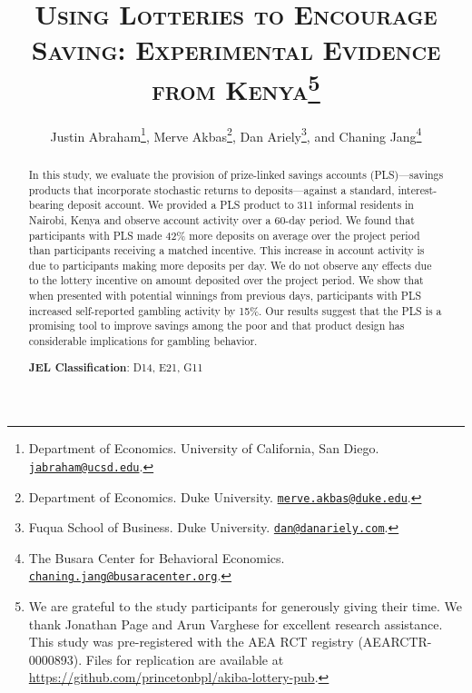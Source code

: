 \documentclass[11pt]{article}
\begin{document}
\title{\textsc{Using Lotteries to Encourage Saving: Experimental Evidence from Kenya}\protect\footnote{We are grateful to the study participants for generously giving their time. We thank Jonathan Page and Arun Varghese for excellent research assistance. This study was pre-registered with the AEA RCT registry (AEARCTR-0000893). Files for replication are available at \url{https://github.com/princetonbpl/akiba-lottery-pub}.}}

\author{Justin Abraham\thanks{Department of Economics. University of California, San Diego. \protect\href{mailto:jabraham@ucsd.edu}{\nolinkurl{jabraham@ucsd.edu}}.}, Merve Akbas\thanks{Department of Economics. Duke University. \protect\href{mailto:merve.akbas@duke.edu}{\nolinkurl{merve.akbas@duke.edu}}.}, Dan Ariely\thanks{Fuqua School of Business. Duke University. \protect\href{mailto:dan@danariely.com}{\nolinkurl{dan@danariely.com}}.}, and Chaning Jang\thanks{The Busara Center for Behavioral Economics. \protect\href{mailto:chaning.jang@busaracenter.org}{\nolinkurl{chaning.jang@busaracenter.org}}.}}

\maketitle

	\begin{abstract}

		In this study, we evaluate the provision of prize-linked savings accounts (PLS)---savings products that incorporate stochastic returns to deposits---against a standard, interest-bearing deposit account. We provided a PLS product to 311 informal residents in Nairobi, Kenya and observe account activity over a 60-day period. We found that participants with PLS made 42\% more deposits on average over the project period than participants receiving a matched incentive. This increase in account activity is due to participants making more deposits per day. We do not observe any effects due to the lottery incentive on amount deposited over the project period. We show that when presented with potential winnings from previous days, participants with PLS increased self-reported gambling activity by 15\%. Our results suggest that the PLS is a promising tool to improve savings among the poor and that product design has considerable implications for gambling behavior.


		\medskip \noindent
		\textbf{JEL Classification}: D14, E21, G11

	\end{abstract}
\end{document}
